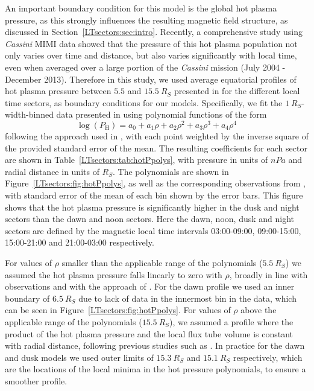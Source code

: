 An important boundary condition for this model is the global hot plasma pressure, as this strongly influences the resulting  magnetic field structure, as discussed in Section~\ref{LTsectors:sec:intro}. Recently, a comprehensive study using \textit{Cassini} MIMI data \citep{sergis2017} showed that the pressure of this hot plasma population not only varies over time and distance, but also varies significantly with local time, even when averaged over a large portion of the \textit{Cassini} mission (July 2004 - December 2013). Therefore in this study, we used average equatorial profiles of hot plasma pressure between $5.5$ and $\SI{15.5}{R_S}$ presented in \citet{sergis2017} for the different local time sectors, as boundary conditions for our models. Specifically, we fit the $\SI{1}{R_S}$-width-binned data presented in \citet{sergis2017} using polynomial functions of the form 
\begin{equation} \label{LTsectors:eq:fourthorderpoly}
\log(P_\mathrm{H}) = a_0+a_1\rho + a_2\rho^2 + a_3\rho^3 + a_4\rho^4
\end{equation}
following the approach used in \citet{sergis2017}, with each point weighted by the inverse square of the provided standard error of the mean. The resulting coefficients for each sector are shown in Table~\ref{LTsectors:tab:hotPpolys}, with pressure in units of $\si{nPa}$ and radial distance in units of $\si{R_S}$. The polynomials are shown in Figure~\ref{LTsectors:fig:hotPpolys}, as well as the corresponding observations from \citet{sergis2017}, with standard error of the mean of each bin shown by the error bars. This figure shows that the hot plasma pressure is significantly higher in the dusk and night sectors than the dawn and noon sectors. Here the dawn, noon, dusk and night sectors are defined by the magnetic local time intervals 03:00-09:00, 09:00-15:00, 15:00-21:00 and 21:00-03:00 respectively.

For values of $\rho$ smaller than the applicable range of the polynomials ($\SI{5.5}{R_S}$) we assumed the hot plasma pressure falls linearly to zero with $\rho$, broadly in line with observations and with the approach of \citet{achilleos2010a}. For the dawn profile we used an inner boundary of $\SI{6.5}{R_S}$ due to lack of data in the innermost bin in the \citet{sergis2017} data, which can be seen in Figure~\ref{LTsectors:fig:hotPpolys}. For values of $\rho$ above the applicable range of the polynomials ($\SI{15.5}{R_S}$), we assumed a profile where the product of the hot plasma pressure and the local flux tube volume is constant with radial distance, following previous studies such as \citet{achilleos2010a,sorba2017}. In practice for the dawn and dusk models we used outer limits of $\SI{15.3}{R_S}$ and $\SI{15.1}{R_S}$ respectively, which are the locations of the local minima in the hot pressure polynomials, to ensure a smoother profile.

